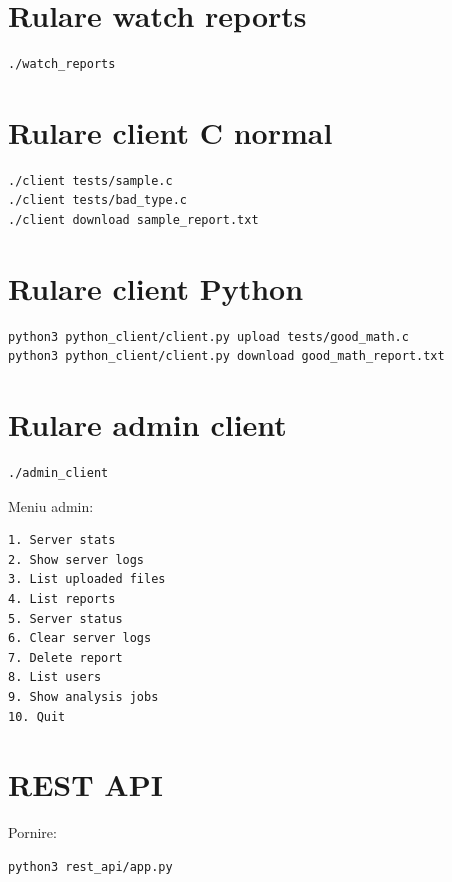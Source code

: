 \documentclass[12pt,a4paper]{article}
\begin{document}
\section{Rulare watch reports}

\begin{lstlisting}[style=code]
./watch_reports
\end{lstlisting}

\section{Rulare client C normal}

\begin{lstlisting}[style=code]
./client tests/sample.c
./client tests/bad_type.c
./client download sample_report.txt
\end{lstlisting}

\section{Rulare client Python}

\begin{lstlisting}[style=code]
python3 python_client/client.py upload tests/good_math.c
python3 python_client/client.py download good_math_report.txt
\end{lstlisting}

\section{Rulare admin client}

\begin{lstlisting}[style=code]
./admin_client
\end{lstlisting}

Meniu admin:

\begin{lstlisting}[style=code]
1. Server stats
2. Show server logs
3. List uploaded files
4. List reports
5. Server status
6. Clear server logs
7. Delete report
8. List users
9. Show analysis jobs
10. Quit
\end{lstlisting}

\section{REST API}

Pornire:

\begin{lstlisting}[style=code]
python3 rest_api/app.py
\end{lstlisting}
\end{document}
